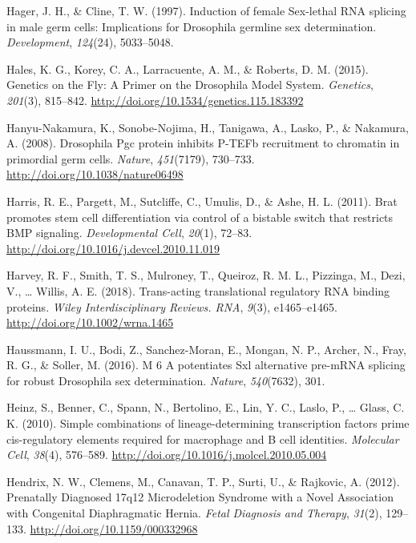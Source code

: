 \documentclass[12pt,twoside]{reedthesis}
\newlength{\cslhangindent}
\newenvironment{cslreferences}%
  {\setlength{\parindent}{0pt}%
  \everypar{\setlength{\hangindent}{\cslhangindent}}\ignorespaces}%
  {\par}
\begin{document}
\begin{cslreferences}
\leavevmode\hypertarget{ref-Hager1997}{}%
Hager, J. H., \& Cline, T. W. (1997). Induction of female Sex-lethal RNA splicing in male germ cells: Implications for Drosophila germline sex determination. \emph{Development}, \emph{124}(24), 5033--5048.

\leavevmode\hypertarget{ref-Hales2015a}{}%
Hales, K. G., Korey, C. A., Larracuente, A. M., \& Roberts, D. M. (2015). Genetics on the Fly: A Primer on the Drosophila Model System. \emph{Genetics}, \emph{201}(3), 815--842. \url{http://doi.org/10.1534/genetics.115.183392}

\leavevmode\hypertarget{ref-Hanyu-Nakamura2008g}{}%
Hanyu-Nakamura, K., Sonobe-Nojima, H., Tanigawa, A., Lasko, P., \& Nakamura, A. (2008). Drosophila Pgc protein inhibits P-TEFb recruitment to chromatin in primordial germ cells. \emph{Nature}, \emph{451}(7179), 730--733. \url{http://doi.org/10.1038/nature06498}

\leavevmode\hypertarget{ref-Harris2011i}{}%
Harris, R. E., Pargett, M., Sutcliffe, C., Umulis, D., \& Ashe, H. L. (2011). Brat promotes stem cell differentiation via control of a bistable switch that restricts BMP signaling. \emph{Developmental Cell}, \emph{20}(1), 72--83. \url{http://doi.org/10.1016/j.devcel.2010.11.019}

\leavevmode\hypertarget{ref-Harvey2018f}{}%
Harvey, R. F., Smith, T. S., Mulroney, T., Queiroz, R. M. L., Pizzinga, M., Dezi, V., \ldots{} Willis, A. E. (2018). Trans-acting translational regulatory RNA binding proteins. \emph{Wiley Interdisciplinary Reviews. RNA}, \emph{9}(3), e1465--e1465. \url{http://doi.org/10.1002/wrna.1465}

\leavevmode\hypertarget{ref-Haussmann2016}{}%
Haussmann, I. U., Bodi, Z., Sanchez-Moran, E., Mongan, N. P., Archer, N., Fray, R. G., \& Soller, M. (2016). M 6 A potentiates Sxl alternative pre-mRNA splicing for robust Drosophila sex determination. \emph{Nature}, \emph{540}(7632), 301.

\leavevmode\hypertarget{ref-heinzSimpleCombinationsLineagedetermining2010}{}%
Heinz, S., Benner, C., Spann, N., Bertolino, E., Lin, Y. C., Laslo, P., \ldots{} Glass, C. K. (2010). Simple combinations of lineage-determining transcription factors prime cis-regulatory elements required for macrophage and B cell identities. \emph{Molecular Cell}, \emph{38}(4), 576--589. \url{http://doi.org/10.1016/j.molcel.2010.05.004}

\leavevmode\hypertarget{ref-hendrixPrenatallyDiagnosed17q122012}{}%
Hendrix, N. W., Clemens, M., Canavan, T. P., Surti, U., \& Rajkovic, A. (2012). Prenatally Diagnosed 17q12 Microdeletion Syndrome with a Novel Association with Congenital Diaphragmatic Hernia. \emph{Fetal Diagnosis and Therapy}, \emph{31}(2), 129--133. \url{http://doi.org/10.1159/000332968}


\end{cslreferences}
\end{document}
